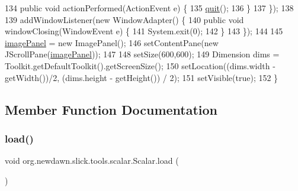\begin{DoxyCode}
134             \textcolor{keyword}{public} \textcolor{keywordtype}{void} actionPerformed(ActionEvent e) \{
135                 \mbox{\hyperlink{classorg_1_1newdawn_1_1slick_1_1tools_1_1scalar_1_1_scalar_ae0f2111b7ad2a03db31292f6ad5f9502}{quit}}();
136             \}
137         \});
138         
139         addWindowListener(\textcolor{keyword}{new} WindowAdapter() \{
140             \textcolor{keyword}{public} \textcolor{keywordtype}{void} windowClosing(WindowEvent e) \{
141                 System.exit(0);
142             \}
143         \});
144         
145         \mbox{\hyperlink{classorg_1_1newdawn_1_1slick_1_1tools_1_1scalar_1_1_scalar_a660c23cbae7b52f06768db8e8841bc39}{imagePanel}} = \textcolor{keyword}{new} ImagePanel();
146         setContentPane(\textcolor{keyword}{new} JScrollPane(\mbox{\hyperlink{classorg_1_1newdawn_1_1slick_1_1tools_1_1scalar_1_1_scalar_a660c23cbae7b52f06768db8e8841bc39}{imagePanel}}));
147         
148         setSize(600,600);
149         Dimension dims = Toolkit.getDefaultToolkit().getScreenSize();
150         setLocation((dims.width - getWidth())/2, (dims.height - getHeight()) / 2);
151         setVisible(\textcolor{keyword}{true});
152     \}
\end{DoxyCode}


\subsection{Member Function Documentation}
\mbox{\label{classorg_1_1newdawn_1_1slick_1_1tools_1_1scalar_1_1_scalar_a52e46006fcc3c6987af1643a97d2d7ef}} 
\subsubsection{\texorpdfstring{load()}{load()}}
{\footnotesize\ttfamily void org.\+newdawn.\+slick.\+tools.\+scalar.\+Scalar.\+load (\begin{DoxyParamCaption}{ }\end{DoxyParamCaption})\hspace{0.3cm}{\ttfamily [inline]}}

